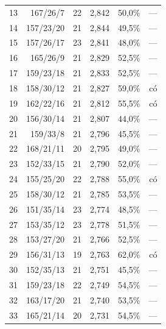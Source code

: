 \begin{center}
\begin{tabular}{@{}rrrrrr@{}}
13 & 167/26/7 & 22 & 2,842 & 50,0\% & — \\

14 & 157/23/20 & 21 & 2,844 & 49,5\% & — \\

15 & 157/26/17 & 23 & 2,841 & 48,0\% & — \\

16 & 165/26/9 & 21 & 2,829 & 52,5\% & — \\

17 & 159/23/18 & 21 & 2,833 & 52,5\% & — \\

18 & 158/30/12 & 21 & 2,827 & 59,0\% & có \\

19 & 162/22/16 & 21 & 2,812 & 55,5\% & có \\

20 & 156/30/14 & 21 & 2,807 & 44,0\% & — \\

21 & 159/33/8 & 21 & 2,796 & 45,5\% & — \\

22 & 168/21/11 & 20 & 2,795 & 49,0\% & — \\

23 & 152/33/15 & 21 & 2,790 & 52,0\% & — \\

24 & 155/25/20 & 22 & 2,788 & 55,0\% & có \\

25 & 158/30/12 & 21 & 2,785 & 53,5\% & — \\

26 & 151/35/14 & 23 & 2,774 & 48,5\% & — \\

27 & 153/35/12 & 23 & 2,778 & 51,5\% & — \\

28 & 153/27/20 & 21 & 2,766 & 52,5\% & — \\

29 & 156/31/13 & 19 & 2,763 & 62,0\% & có \\

30 & 152/35/13 & 21 & 2,751 & 45,5\% & — \\

31 & 159/23/18 & 22 & 2,749 & 54,5\% & — \\

32 & 163/17/20 & 21 & 2,740 & 53,5\% & — \\

33 & 165/21/14 & 20 & 2,731 & 54,5\% & — \\


\end{tabular}
\end{center}
